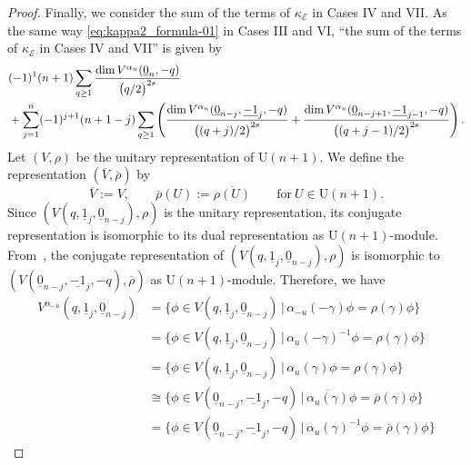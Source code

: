 \documentclass[pdftex]{sigma}
\numberwithin{equation}{section}
\newcommand{\cE}{\mathcal{E}}
\begin{document}
\begin{proof}
 Finally, we consider the sum of the terms of $\kappa_{\cE}$ in Cases IV and VII.
 As the same way \eqref{eq:kappa2_formula-01} in Cases III and VI,
 ``the sum of the terms of $\kappa_{\cE}$ in Cases IV and VII''
 is given by
 \begin{align}
 &
 (-1 )^{1} (n+1)
 \sum_{q \geq 1 }
 \frac{
 \dim V^{\alpha_u} ( \underline{0}_{n}, -q )
 }{
 \bigl( q /2 \bigr)^{2s}
 }
 \label{eq:kappa3_formula-01}
 \\
 &{}+
 \sum_{j=1}^{n}
 (-1 )^{j+1} (n+1-j)
 \sum_{q \geq 1 }
 \left(
 \frac{
 \dim V^{\alpha_u} ( \underline{0}_{n-j}, \underline{-1}_{j} , -q )
 }{
 \bigl( ( q+j)/2 \bigr)^{2s}
 }
 +
 \frac{
 \dim V^{\alpha_u} ( \underline{0}_{n-j+1}, \underline{-1}_{j-1} , -q )
 }{
 \bigl( (q+j-1)/2 \bigr)^{2s}
 }
 \right). \notag
 \end{align}
 Let $(V , \rho)$ be the unitary representation of $\mathrm{U}(n+1)$.
 We define the representation $(\overline{V}, \overline{\rho})$ by
 \[
 \overline{V} := V,
 \qquad
 \overline{\rho} (U)
 :=
 \overline{\rho (U)}
 \qquad \text{for} \ U \in \mathrm{U} (n+1)
 .
 \]
 Since $(V ( q, \underline{1}_{j} ,\underline{0}_{n-j} ) ,\rho )$ is the unitary representation,
 its conjugate representation is isomorphic to its dual representation as $\mathrm{U}(n+1)$-module.
 From~\cite[Theorem 3.2.13]{Goodman-Wallach-09},
 the conjugate representation of $( V ( q, \underline{1}_{j} ,\underline{0}_{n-j} ) , \rho )$ is isomorphic to
 $(V ( \underline{0}_{n-j} , \underline{-1}_{j} , -q ) , \overline{\rho} )$ as $\mathrm{U}(n+1)$-module.
 Therefore, we have
 \begin{align*}
 V^{\alpha_{-u}} ( q, \underline{1}_{j} ,\underline{0}_{n-j} )
 & =
 \big\{ \phi \in V ( q, \underline{1}_{j} ,\underline{0}_{n-j}) \, \big| \, \alpha_{-u} (- \gamma ) \phi = \rho ( \gamma ) \phi \big\}
 \\
 & =
 \big\{ \phi \in V ( q, \underline{1}_{j} ,\underline{0}_{n-j}) \, \big| \, \alpha_u (- \gamma )^{-1} \phi = \rho ( \gamma ) \phi \big\}
 \\
 & =
 \big\{ \phi \in V ( q, \underline{1}_{j} ,\underline{0}_{n-j}) \, \big| \, \alpha_u ( \gamma ) \phi = \rho ( \gamma ) \phi \big\}
 \\
 & \cong
 \big\{ \phi \in V ( \underline{0}_{n-j}, \underline{-1}_{j} , -q ) \, \big| \, \overline{\alpha_u ( \gamma )} \phi = \overline{\rho} ( \gamma ) \phi \big\}
 \\
 & =
 \big\{ \phi \in V ( \underline{0}_{n-j}, \underline{-1}_{j} ,-q ) \, \big| \, \alpha_u ( \gamma )^{-1} \phi = \overline{\rho} ( \gamma ) \phi \big\}

\end{align*}
\end{proof}
\end{document}
